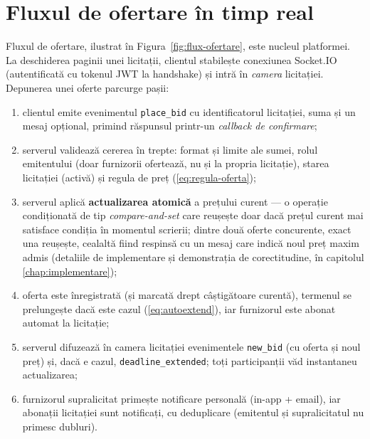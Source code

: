 \section{Fluxul de ofertare în timp real}
\label{sec:flux-ofertare}

Fluxul de ofertare, ilustrat în Figura~\ref{fig:flux-ofertare}, este nucleul platformei. La deschiderea paginii unei licitații, clientul stabilește conexiunea Socket.IO (autentificată cu tokenul JWT la handshake) și intră în \textit{camera} licitației. Depunerea unei oferte parcurge pașii:

\begin{enumerate}
    \item clientul emite evenimentul \texttt{place\_bid} cu identificatorul licitației, suma și un mesaj opțional, primind răspunsul printr-un \textit{callback de confirmare};
    \item serverul validează cererea în trepte: format și limite ale sumei, rolul emitentului (doar furnizorii ofertează, nu și la propria licitație), starea licitației (activă) și regula de preț (\ref{eq:regula-oferta});
    \item serverul aplică \textbf{actualizarea atomică} a prețului curent --- o operație condiționată de tip \textit{compare-and-set} care reușește doar dacă prețul curent mai satisface condiția în momentul scrierii; dintre două oferte concurente, exact una reușește, cealaltă fiind respinsă cu un mesaj care indică noul preț maxim admis (detaliile de implementare și demonstrația de corectitudine, în capitolul \ref{chap:implementare});
    \item oferta este înregistrată (și marcată drept câștigătoare curentă), termenul se prelungește dacă este cazul (\ref{eq:autoextend}), iar furnizorul este abonat automat la licitație;
    \item serverul difuzează în camera licitației evenimentele \texttt{new\_bid} (cu oferta și noul preț) și, dacă e cazul, \texttt{deadline\_extended}; toți participanții văd instantaneu actualizarea;
    \item furnizorul supralicitat primește notificare personală (in-app + email), iar abonații licitației sunt notificați, cu deduplicare (emitentul și supralicitatul nu primesc dubluri).
\end{enumerate}


